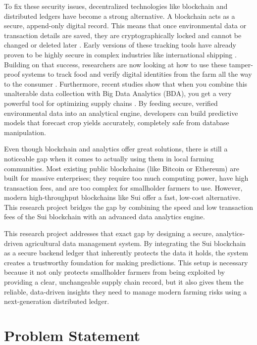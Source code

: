 To fix these security issues, decentralized technologies like blockchain and distributed ledgers have become a strong alternative. A blockchain acts as a secure, append-only digital record. This means that once environmental data or transaction details are saved, they are cryptographically locked and cannot be changed or deleted later \parencite{alabsi2023blockchain}. Early versions of these tracking tools have already proven to be highly secure in complex industries like international shipping \parencite{liu2021blockchain}. Building on that success, researchers are now looking at how to use these tamper-proof systems to track food and verify digital identities from the farm all the way to the consumer \parencite{cocco2021blockchain}. Furthermore, recent studies show that when you combine this unalterable data collection with Big Data Analytics (BDA), you get a very powerful tool for optimizing supply chains \parencite{chauhan2025blockchain}. By feeding secure, verified environmental data into an analytical engine, developers can build predictive models that forecast crop yields accurately, completely safe from database manipulation.

Even though blockchain and analytics offer great solutions, there is still a noticeable gap when it comes to actually using them in local farming communities. Most existing public blockchains (like Bitcoin or Ethereum) are built for massive enterprises; they require too much computing power, have high transaction fees, and are too complex for smallholder farmers to use. However, modern high-throughput blockchains like Sui offer a fast, low-cost alternative. This research project bridges the gap by combining the speed and low transaction fees of the Sui blockchain with an advanced data analytics engine.

This research project addresses that exact gap by designing a secure, analytics-driven agricultural data management system. By integrating the Sui blockchain as a secure backend ledger that inherently protects the data it holds, the system creates a trustworthy foundation for making predictions. This setup is necessary because it not only protects smallholder farmers from being exploited by providing a clear, unchangeable supply chain record, but it also gives them the reliable, data-driven insights they need to manage modern farming risks using a next-generation distributed ledger.

\section{Problem Statement}

